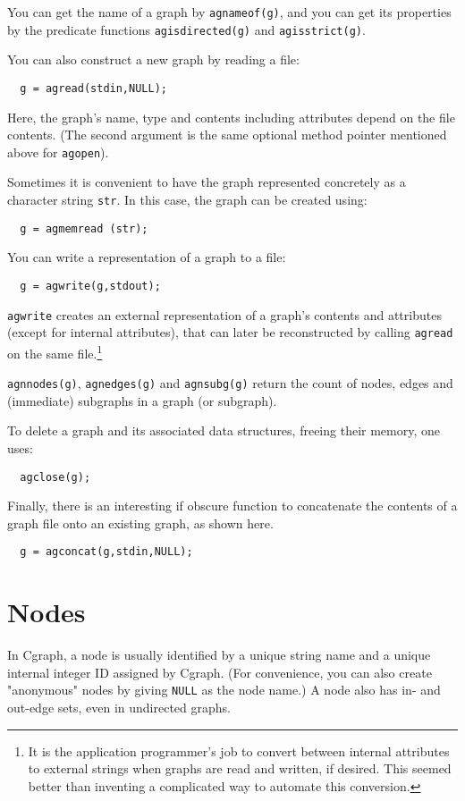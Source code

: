 \documentclass[11pt,letterpaper]{article}
\begin{document}
You can get the name of a graph by \verb"agnameof(g)", and
you can get its properties by the predicate functions
{\tt agisdirected(g)} and {\tt agisstrict(g)}.

You can also construct a new graph by reading a file:
\begin{verbatim}
  g = agread(stdin,NULL);
\end{verbatim}

Here, the graph's name, type and contents including attributes depend
on the file contents.  (The second argument is the same optional method
pointer mentioned above for \verb"agopen").

Sometimes it is convenient to have the graph represented concretely as a 
character string \verb"str".
In this case, the graph can be created using:
\begin{verbatim}
  g = agmemread (str);
\end{verbatim}

You can write a representation of a graph to a file:

\begin{verbatim}
  g = agwrite(g,stdout);
\end{verbatim}

\verb"agwrite" creates an external representation of a graph's
contents and attributes (except for internal attributes),
that can later be reconstructed by calling \verb"agread"
on the same file.\footnote{It is the application programmer's job to
convert between internal attributes to external strings
when graphs are read and written, if desired.
This seemed better than inventing a complicated way
to automate this conversion.}

\verb"agnnodes(g)", \verb"agnedges(g)" and \verb"agnsubg(g)" return the count of nodes,
edges and (immediate) subgraphs in a graph (or subgraph).

To delete a graph and its associated data structures,
freeing their memory, one uses:
\begin{verbatim}
  agclose(g);
\end{verbatim}

Finally, there is an interesting if obscure function to concatenate
the contents of a graph file onto an existing graph, as shown here.
\begin{verbatim}
  g = agconcat(g,stdin,NULL);
\end{verbatim}

\section{Nodes}
\label{sec:nodes}
In Cgraph, a node is usually identified by a unique string name
and a unique internal integer ID assigned by Cgraph.
(For convenience, you can also create "anonymous" nodes by
giving \verb"NULL" as the node name.) A node also has in- and out-edge sets,
even in undirected graphs.
\end{document}
